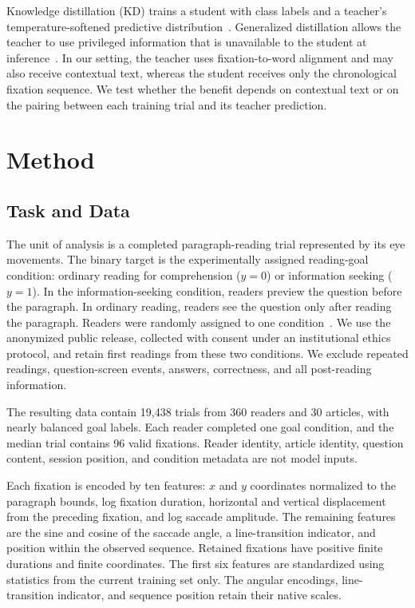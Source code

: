 \documentclass[conference,letterpaper]{IEEEtran}
\begin{document}
Knowledge distillation (KD) trains a student with class labels and a teacher's
temperature-softened predictive distribution~\cite{hinton2015distilling}.
Generalized distillation allows the teacher to use privileged information that
is unavailable to the student at inference~\cite{lopezpaz2016unifying}.  In our
setting, the teacher uses fixation-to-word alignment and may also receive
contextual text, whereas the student receives only the chronological fixation
sequence.  We test whether the benefit depends on contextual text or on the
pairing between each training trial and its teacher prediction.

\section{Method}

\subsection{Task and Data}

The unit of analysis is a completed paragraph-reading trial represented by its
eye movements.  The binary target is the experimentally assigned reading-goal
condition: ordinary reading for comprehension ($y=0$) or information seeking
($y=1$).  In the information-seeking condition, readers preview the question
before the paragraph.  In ordinary reading, readers see the question only
after reading the paragraph.  Readers
were randomly assigned to one condition~\cite{berzak2025onestop}.  We use the
anonymized public release, collected with consent under an institutional ethics
protocol, and retain first readings from these two conditions.  We exclude
repeated readings, question-screen events, answers, correctness, and all
post-reading information.

The resulting data contain 19,438 trials from 360 readers and 30 articles, with
nearly balanced goal labels.  Each reader completed one goal condition, and the
median trial contains 96 valid fixations.  Reader identity, article identity,
question content, session position, and condition metadata are not model
inputs.

Each fixation is encoded by ten features: $x$ and $y$ coordinates normalized to
the paragraph bounds, log fixation duration, horizontal and vertical
displacement from the preceding fixation, and log saccade amplitude.  The
remaining features are the sine and cosine of the saccade angle, a
line-transition indicator, and position within the observed sequence.  Retained
fixations have positive finite durations and finite coordinates.  The first six
features are standardized using statistics from the current training set only.
The angular encodings, line-transition indicator, and sequence position retain
their native scales.
\end{document}
